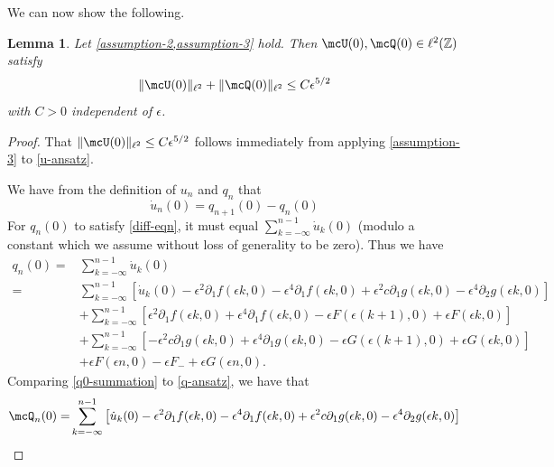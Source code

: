 \documentclass[oneside,reqno]{amsart}
\newcommand{\Z}{\mathbb{Z}}
\newtheorem{lem}{Lemma}[section]
\begin{document}
We can now show the following.
\begin{lem}\label{initial-conditions-lem}
	Let \cref{assumption-2,assumption-3} hold. Then \(\mcU(0),\mcQ(0) \in \ell^2(\Z)\) satisfy
	\begin{equation}\label{initial-condition-ineq}
		\| \mcU(0) \|_{\ell^2} + \|\mcQ(0)\|_{\ell^2} \leq C \epsilon^{5/2}
	\end{equation}
	with \(C>0\) independent of \(\epsilon\).
\end{lem}

\begin{proof}
	That \(\|\mcU(0)\|_{\ell^2}\leq C \epsilon^{5/2}\) follows immediately from applying \cref{assumption-3} to \cref{u-ansatz}.
	
	We have from the definition of \(u_n\) and \(q_n\) that
	\begin{equation}\label{diff-eqn}
		\dot u_n(0) = q_{n+1}(0) - q_n(0)
	\end{equation}
	For \(q_n(0)\) to satisfy \cref{diff-eqn}, it must equal \(\sum_{k=-\infty}^{n-1} \dot u_k(0)\) (modulo a constant which we assume without loss of generality to be zero). Thus we have
	\begin{equation}\label{q0-summation}
		\begin{aligned}	
			q_n(0) =& \sum_{k=-\infty}^{n-1} \dot u_k(0)\\
			=& \sum_{k=-\infty}^{n-1}\left[ \dot u_k(0) - \epsilon^2 \partial_1 f(\epsilon k,0) - \epsilon^4 \partial_1 f(\epsilon k,0) + \epsilon^2 c \partial_1 g(\epsilon k,0) - \epsilon^4 \partial_2g(\epsilon k,0)\right] \\
			&+\sum_{k=-\infty}^{n-1}\left[  \epsilon^2 \partial_1 f(\epsilon k,0) +\epsilon^4 \partial_1 f(\epsilon k,0) - \epsilon F(\epsilon(k+1),0) +\epsilon F(\epsilon k ,0)  \right] \\
			&+ \sum_{k=-\infty}^{n-1}\left[ - \epsilon^2 c\partial_1 g(\epsilon k,0) +\epsilon^4 \partial_1 g(\epsilon k,0) - \epsilon G(\epsilon(k+1),0) +\epsilon G(\epsilon k ,0)  \right] \\
			&+ \epsilon F(\epsilon n, 0) - \epsilon F_- + \epsilon G(\epsilon n, 0).
		\end{aligned}
	\end{equation}
	Comparing \cref{q0-summation} to \cref{q-ansatz}, we have that 
	\begin{equation*}\label{mcq-zero}
		\begin{aligned}
			\mcQ_n(0) =& \sum_{k=-\infty}^{n-1}\left[ \dot u_k(0) - \epsilon^2 \partial_1 f(\epsilon k,0) - \epsilon^4 \partial_1 f(\epsilon k,0) + \epsilon^2 c \partial_1 g(\epsilon k,0) - \epsilon^4 \partial_2g(\epsilon k,0)\right] \\

\end{aligned}
\end{equation*}
\end{proof}
\end{document}
